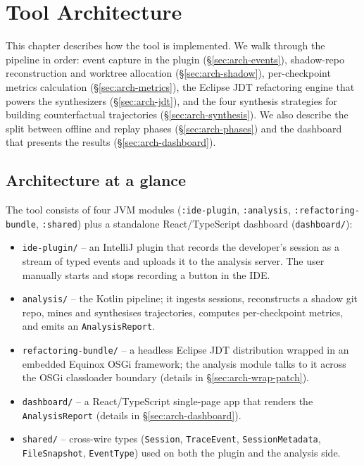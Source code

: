 \chapter{Tool Architecture}
\label{ch:architecture}

This chapter describes how the tool is implemented. We walk through the pipeline in order: event capture in the plugin (\S\ref{sec:arch-events}), shadow-repo reconstruction and worktree allocation (\S\ref{sec:arch-shadow}), per-checkpoint metrics calculation (\S\ref{sec:arch-metrics}), the Eclipse JDT refactoring engine that powers the synthesizers (\S\ref{sec:arch-jdt}), and the four synthesis strategies for building counterfactual trajectories (\S\ref{sec:arch-synthesis}). We also describe the split between offline and replay phases (\S\ref{sec:arch-phases}) and the dashboard that presents the results (\S\ref{sec:arch-dashboard}).

\section{Architecture at a glance}
\label{sec:arch-overview}

The tool consists of four JVM modules (\texttt{:ide-plugin}, \texttt{:analysis}, \texttt{:refactoring-bundle}, \texttt{:shared}) plus a standalone React/TypeScript dashboard (\texttt{dashboard/}):

\begin{itemize}
  \item \texttt{ide-plugin/} -- an IntelliJ plugin that records the developer's session as a stream of typed events and uploads it to the analysis server. The user manually starts and stops recording a button in the IDE.
  \item \texttt{analysis/} -- the Kotlin pipeline; it ingests sessions, reconstructs a shadow git repo, mines and synthesises trajectories, computes per-checkpoint metrics, and emits an \texttt{AnalysisReport}.
  \item \texttt{refactoring-bundle/} -- a headless Eclipse JDT distribution wrapped in an embedded Equinox OSGi framework; the analysis module talks to it across the OSGi class\-loader boundary (details in \S\ref{sec:arch-wrap-patch}).
  \item \texttt{dashboard/} -- a React/TypeScript single-page app that renders the \texttt{AnalysisReport} (details in \S\ref{sec:arch-dashboard}).
  \item \texttt{shared/} -- cross-wire types (\texttt{Session}, \texttt{TraceEvent}, \texttt{SessionMetadata}, \texttt{FileSnapshot}, \texttt{EventType}) used on both the plugin and the analysis side.
\end{itemize}

